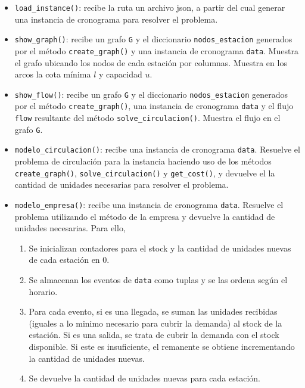 \documentclass{article}
\begin{document}
\begin{itemize}
	\item \texttt{load\_instance()}: recibe la ruta un archivo json, a partir del cual generar una instancia de cronograma para resolver el problema.
	\item \texttt{show\_graph()}: recibe un grafo \texttt{G} y el diccionario \texttt{nodos\_estacion} generados por el método \texttt{create\_graph()} y una instancia de cronograma \texttt{data}. Muestra el grafo ubicando los nodos de cada estación por columnas. Muestra en los arcos la cota mínima $l$ y capacidad $u$.
	\item \texttt{show\_flow()}:   recibe un grafo \texttt{G} y el diccionario \texttt{nodos\_estacion} generados por el método \texttt{create\_graph()}, una instancia de cronograma \texttt{data} y el flujo \texttt{flow} resultante del método \texttt{solve\_circulacion()}. Muestra el flujo en el grafo \texttt{G}.
	\item \texttt{modelo\_circulacion()}: recibe una instancia de cronograma \texttt{data}. Resuelve el problema de circulación para la instancia haciendo uso de los métodos \texttt{create\_graph()}, \texttt{solve\_circulacion()} y \texttt{get\_cost()}, y devuelve el la cantidad de unidades necesarias para resolver el problema.
	\item \texttt{modelo\_empresa()}: recibe una instancia de cronograma \texttt{data}. Resuelve el problema utilizando el método de la empresa y devuelve la cantidad de unidades necesarias. Para ello,

\begin{enumerate}
    \item Se inicializan contadores para el stock  y la cantidad de unidades nuevas de cada estación en 0.

    \item Se almacenan los eventos de  \texttt{data} como tuplas y se las ordena según el horario.

    \item Para cada evento, si es una llegada, se suman las unidades recibidas (iguales a lo minimo necesario para cubrir la demanda) al stock de la estación. Si es una salida, se trata de cubrir la demanda con el stock disponible. Si este es insuficiente, el remanente se obtiene incrementando la cantidad de unidades nuevas.

    \item Se devuelve la cantidad de unidades nuevas para cada estación.
\end{enumerate}

\end{itemize}
\end{document}
